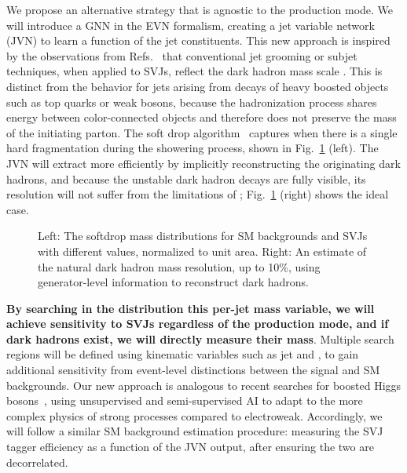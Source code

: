 We propose an alternative strategy that is agnostic to the production mode.
We will introduce a GNN in the EVN formalism, creating a jet variable network (JVN) to learn a function of the jet constituents.
This new approach is inspired by the observations from Refs.~\cite{Strassler:2008fv,CMS:2021dzg} that conventional jet grooming or subjet techniques, when applied to SVJs, reflect the dark hadron mass scale \mdark.
This is distinct from the behavior for jets arising from decays of heavy boosted objects such as top quarks or weak bosons,
because the hadronization process shares energy between color-connected objects and therefore does not preserve the mass of the initiating parton.
The soft drop algorithm~\cite{Larkoski:2014wba} captures \mdark when there is a single hard fragmentation during the showering process, shown in Fig.~\ref{fig:svjmass} (left).
The JVN will extract \mdark more efficiently by implicitly reconstructing the originating dark hadrons,
and because the unstable dark hadron decays are fully visible, its resolution will not suffer from the limitations of \ptmiss;
Fig.~\ref{fig:svjmass} (right) shows the ideal case.

\begin{figure}[htb!]
\centering
{}
\caption{Left: The softdrop mass distributions for SM backgrounds and SVJs with different \mdark values, normalized to unit area.
Right: An estimate of the natural dark hadron mass resolution, up to 10\%, using generator-level information to reconstruct dark hadrons.}
\label{fig:svjmass}
\end{figure}

\textbf{By searching in the distribution this per-jet mass variable, we will achieve sensitivity to SVJs regardless of the production mode, and if dark hadrons exist, we will directly measure their mass}.
Multiple search regions will be defined using kinematic variables such as jet \pt and \ptmiss,
to gain additional sensitivity from event-level distinctions between the signal and SM backgrounds.
Our new approach is analogous to recent searches for boosted Higgs bosons~\cite{CMS:2020zge},
using unsupervised and semi-supervised AI to adapt to the more complex physics of strong processes compared to electroweak.
Accordingly, we will follow a similar SM background estimation procedure:
measuring the SVJ tagger efficiency as a function of the JVN output, after ensuring the two are decorrelated.

